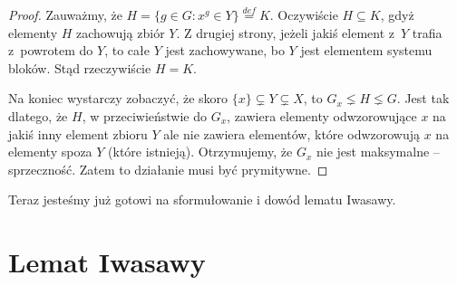 \documentclass[licencjacka]{pracamgr}
\begin{document}
\begin{proof}
Zauważmy, że $H = \{ g \in G \colon x^g \in Y\} \stackrel{def}{=}
K$. Oczywiście $H \subseteq K$, gdyż elementy $H$ zachowują zbiór
$Y$. Z drugiej strony, jeżeli jakiś element z~$Y$ trafia z~powrotem
do $Y$, to całe $Y$ jest zachowywane, bo $Y$ jest elementem
systemu bloków. Stąd rzeczywiście $H = K$.

Na koniec wystarczy zobaczyć, że skoro $\{x\} \subsetneq  Y
\subsetneq X$, to $G_x \lneq H \lneq G$. Jest tak dlatego, że $H$, w
przeciwieństwie do $G_x$, zawiera elementy odwzorowujące $x$ na
jakiś inny element zbioru $Y$ ale nie zawiera elementów, które
odwzorowują $x$ na elementy spoza $Y$ (które istnieją). Otrzymujemy, że $G_x$
nie jest maksymalne -- sprzeczność. Zatem to działanie musi być
prymitywne.
\end{proof}

Teraz jesteśmy już gotowi na sformułowanie i dowód lematu Iwasawy.

\section{Lemat Iwasawy}
\end{document}
